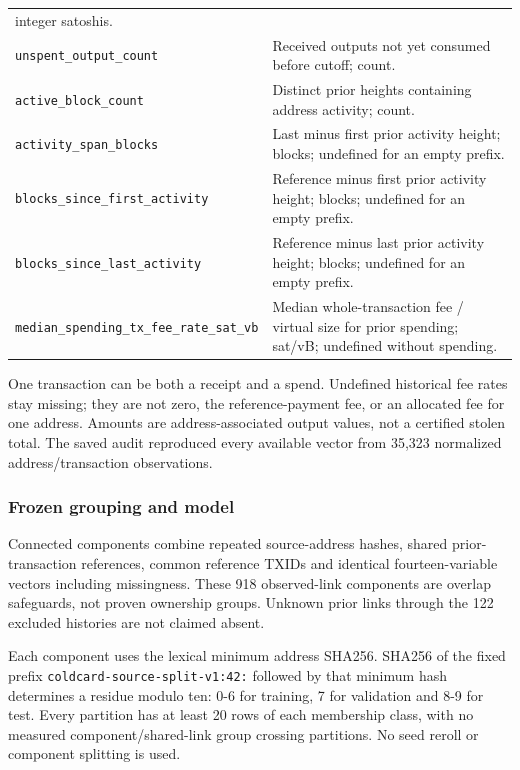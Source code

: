 \begin{longtable}[]{@{}
  >{\raggedright\arraybackslash}p{}
  >{\raggedright\arraybackslash}p{}@{}}
integer satoshis. \\
\texttt{unspent\_\allowbreak{}output\_\allowbreak{}count} & Received outputs not yet consumed
before cutoff; count. \\
\texttt{active\_\allowbreak{}block\_\allowbreak{}count} & Distinct prior heights containing
address activity; count. \\
\texttt{activity\_\allowbreak{}span\_\allowbreak{}blocks} & Last minus first prior activity
height; blocks; undefined for an empty prefix. \\
\texttt{blocks\_\allowbreak{}since\_\allowbreak{}first\_\allowbreak{}activity} & Reference minus first prior
activity height; blocks; undefined for an empty prefix. \\
\texttt{blocks\_\allowbreak{}since\_\allowbreak{}last\_\allowbreak{}activity} & Reference minus last prior
activity height; blocks; undefined for an empty prefix. \\
\texttt{median\_\allowbreak{}spending\_\allowbreak{}tx\_\allowbreak{}fee\_\allowbreak{}rate\_\allowbreak{}sat\_\allowbreak{}vb} & Median
whole-transaction fee / virtual size for prior spending; sat/vB;
undefined without spending. \\
\end{longtable}

One transaction can be both a receipt and a spend. Undefined historical
fee rates stay missing; they are not zero, the reference-payment fee, or
an allocated fee for one address. Amounts are address-associated output
values, not a certified stolen total. The saved audit reproduced every
available vector from 35,323 normalized address/transaction
observations.

\hypertarget{frozen-grouping-and-model}{%
\subsubsection{Frozen grouping and
model}\label{frozen-grouping-and-model}}

Connected components combine repeated source-address hashes, shared
prior-transaction references, common reference TXIDs and identical
fourteen-variable vectors including missingness. These 918 observed-link
components are overlap safeguards, not proven ownership groups. Unknown
prior links through the 122 excluded histories are not claimed absent.

Each component uses the lexical minimum address SHA256. SHA256 of the
fixed prefix \texttt{coldcard-\allowbreak{}source-\allowbreak{}split-\allowbreak{}v1:42:} followed by that
minimum hash determines a residue modulo ten: 0-6 for training, 7 for
validation and 8-9 for test. Every partition has at least 20 rows of
each membership class, with no measured component/shared-link group
crossing partitions. No seed reroll or component splitting is used.

